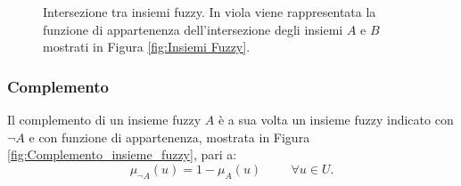 \documentclass[a4paper,12pt]{report}
\begin{document}
\begin{figure}[ht]
    \centering
    \caption{Intersezione tra insiemi fuzzy. In viola viene rappresentata la funzione di appartenenza dell'intersezione degli insiemi $A$ e $B$ mostrati in Figura \ref{fig:Insiemi Fuzzy}.}
    \label{fig:Intersezione_insiemi_fuzzy}   

\end{figure}

\subsubsection{Complemento}
Il complemento di un insieme fuzzy $A$ è a sua volta un insieme fuzzy indicato con $\neg A$ e con funzione di appartenenza, mostrata in Figura \ref{fig:Complemento_insieme_fuzzy}, pari a:
\begin{equation*}
    \mu_{\neg A}(u) = 1 - \mu_A(u) \hspace{1cm}  \forall u\in U.
\end{equation*}
\end{document}
